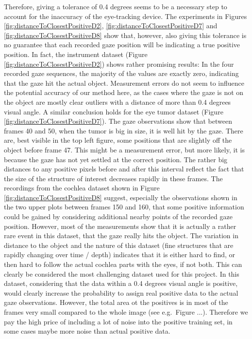 Therefore, giving a tolerance of 0.4 degrees seems to be a necessary step to account for the inaccuracy of the eye-tracking device. 
The experiments in Figures \ref{fig:distanceToClosestPositiveD2}, \ref{fig:distanceToClosestPositiveD7} and \ref{fig:distanceToClosestPositiveD8} show that, however, also giving this tolerance is no guarantee that each recorded gaze position will be indicating a true positive position. 
In fact, the instrument dataset (Figure \ref{fig:distanceToClosestPositiveD2}) shows rather promising results: 
In the four recorded gaze sequences, the majority of the values are exactly zero, indicating that the gaze hit the actual object. 
Measurement errors do not seem to influence the potential accuracy of our method here, as the cases where the gaze is not on the object are mostly clear outliers with a distance of more than 0.4 degrees visual angle. 
A similar conclusion holds for the eye tumor dataset (Figure \ref{fig:distanceToClosestPositiveD7}). 
The gaze observations show that between frames 40 and 50, when the tumor is big in size, it is well hit by the gaze. 
There are, best visible in the top left figure, some positions that are slightly off the object before frame 47. 
This might be a measurement error, but more likely, it is because the gaze has not yet settled at the correct position. 
The rather big distances to any positive pixels before and after this interval reflect the fact that the size of the structure of interest decreases rapidly in these frames. 
The recordings from the cochlea dataset shown in Figure \ref{fig:distanceToClosestPositiveD8} suggest, especially the observations shown in the two upper plots between frames 150 and 160, that some positive information could be gained by considering additional nearby points of the recorded gaze position.
However, most of the measurements show that it is actually a rather rare event in this dataset, that the gaze really hits the object. 
The variation in distance to the object and the nature of this dataset (fine structures that are rapidly changing over time / depth) indicates that it is either hard to find, or then hard to follow the actual cochlea parts with the eyes, if not both. 
This can clearly be considered the most challenging dataset used for this project.
In this dataset, considering that the data within a 0.4 degrees visual angle is positive, would clearly increase the probability to assign real positive data to the actual gaze observations. 
However, the total area ot the positives is in most of the frames very small compared to the whole image (see e.g.\ Figure ...). 
Therefore we pay the high price of including a lot of noise into the positive training set, in some cases maybe more noise than actual positive data.

